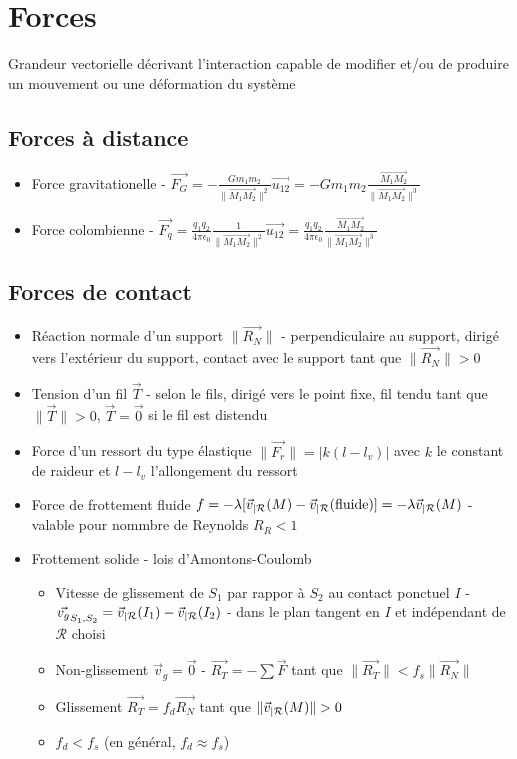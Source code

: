 \documentclass[openany]{book}
\begin{document}
\section{Forces}
Grandeur vectorielle décrivant l'interaction capable de modifier et/ou de produire un mouvement ou une déformation du système

\subsection{Forces à distance}
\begin{itemize}
    \item Force gravitationelle - $ \vec{F_G} = -\frac{G m_1 m_2}{\| \overrightarrow{M_1 M_2} \|^2}\vec{u_{12}} = -G m_1 m_2\frac{\overrightarrow{M_1 M_2}}{\| \overrightarrow{M_1 M_2} \|^3} $
    \item Force colombienne - $ \vec{F_q} = \frac{q_1 q_2}{4 \pi \epsilon_0} \frac{1}{\| \overrightarrow{M_1 M_2} \|^2}\vec{u_{12}} =  \frac{q_1 q_2}{4 \pi \epsilon_0} \frac{\overrightarrow{M_1 M_2}}{\| \overrightarrow{M_1 M_2} \|^3} $
\end{itemize}

\subsection{Forces de contact}
\begin{itemize}
    \item Réaction normale d'un support $ \|\vec{R_N}\| $ - perpendiculaire au support, dirigé vers l'extérieur du support, contact avec le support tant que $ \|\vec{R_N}\| > 0 $
    \item Tension d'un fil $ \vec{T} $ - selon le fils, dirigé vers le point fixe, fil tendu tant que $ \|\vec{T}\| > 0 $, $\vec{T} = \vec{0}$ si le fil est distendu
    \item Force d'un ressort du type élastique $ \|\vec{F_r}\| = |k(l - l_v)| $ avec $k$ le constant de raideur et $l - l_v$ l'allongement du ressort
    \item Force de frottement fluide $ f = -\lambda [\vec{v}_{|\mathcal{R}}(M) - \vec{v}_{|\mathcal{R}}(\text{fluide})] = -\lambda \vec{v}_{|\mathcal{R}}(M) $ - valable pour nommbre de Reynolds $R_R < 1$
    \item Frottement solide - lois d'Amontons-Coulomb
    \begin{itemize}
        \item Vitesse de glissement de $S_1$ par rappor à $S_2$ au contact ponctuel $I$ - $\vec{v_g}_{S_1, S_2} = \vec{v}_{|\mathcal{R}}(I_1) - \vec{v}_{|\mathcal{R}}(I_2)$ - dans le plan tangent en $I$ et indépendant de $\mathcal{R}$ choisi
        \item Non-glissement $\vec{v}_g = \vec{0}$ - $ \vec{R_T} = -\sum \vec{F} $ tant que $\|\vec{R_T}\| < f_s\|\vec{R_N}\|$
        \item Glissement $ \vec{R_T} = f_d \vec{R_N} $ tant que $ \|\vec{v}_{|\mathcal{R}}(M)\| > 0 $
        \item $f_d < f_s$ (en général, $f_d \approx f_s$)
    \end{itemize}
\end{itemize}
\end{document}
